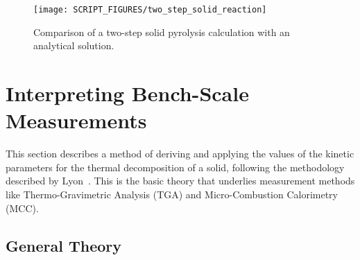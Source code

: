 \documentclass[11pt]{book}
\begin{document}
\begin{figure}[!htb]
\centering
\texttt{[image: SCRIPT\_FIGURES/two\_step\_solid\_reaction]}
\caption[The  test case]{Comparison of a two-step solid pyrolysis calculation with an analytical solution.}
\label{fig:two_step_solid_reaction}
\end{figure}


\clearpage


\section{Interpreting Bench-Scale Measurements}
\label{solid_kinetics}

This section describes a method of deriving and applying the values of the kinetic parameters for the thermal decomposition of a solid, following the methodology described by Lyon~\cite{Lyon:FM2000}. This is the basic theory that underlies measurement methods like Thermo-Gravimetric Analysis (TGA) and Micro-Combustion Calorimetry (MCC).


\subsection{General Theory}
\end{document}
